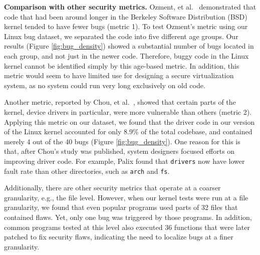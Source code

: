 \noindent
{\bf Comparison with other security metrics.}
Ozment, et al.~\cite{ozment2006milk} demonstrated that code that
had been around longer in the Berkeley Software Distribution (BSD) \cite{BSD}
kernel tended to have fewer bugs (metric 1).
To test Ozment's metric using our Linux bug dataset,
we separated the code into five different age groups.
Our results (Figure \ref{fig:bug_density}) showed a substantial
number of bugs located in each group, and not just in the newer code.
Therefore, buggy code in the Linux kernel cannot be identified simply
by this age-based metric.
In addition, this metric would seem to have limited use for designing a secure
virtualization system,
as no system could run very long exclusively on old code.

Another metric, reported by Chou, et al.~\cite{PittSFIeld}, showed that certain parts of the kernel,
device drivers in particular, were more vulnerable than others (metric 2).
Applying this metric on our dataset, we found that the driver code in our version
of the Linux kernel accounted for only 8.9\% of the total codebase, and contained
merely 4 out of the 40 bugs (Figure \ref{fig:bug_density}).
One reason for this is that, after Chou's study was published, system
designers focused efforts on improving driver code. For example, Palix \cite{palix2011faults}
found that %
\texttt{drivers} now have lower fault rate than other directories,
such as \texttt{arch} and \texttt{fs}.


Additionally, there are other security metrics that operate at a coarser granularity,
e.g., the file level. However, when our kernel tests were run at a file
granularity, we found that even popular programs used parts of %
32 files that contained flaws. Yet, only one bug was triggered by those programs.
In addition, common programs tested at this level also executed 36 functions
that were later patched to fix security
flaws, indicating the need to localize bugs at a finer granularity.

